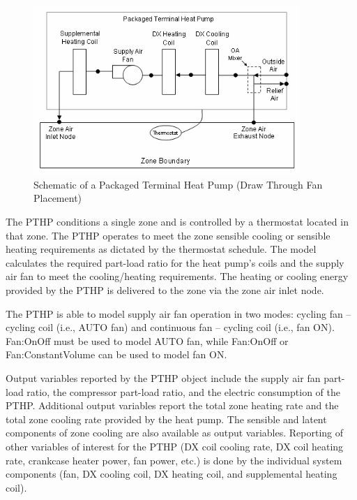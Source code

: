 \begin{figure}[hbtp] %
\centering
\includegraphics[width=0.9\textwidth, height=0.9\textheight, keepaspectratio=true]{media/image7215.png}
\caption{Schematic of a Packaged Terminal Heat Pump (Draw Through Fan Placement) \protect \label{fig:schematic-of-a-packaged-terminal-heat-pump}}
\end{figure}

The PTHP conditions a single zone and is controlled by a thermostat located in that zone. The PTHP operates to meet the zone sensible cooling or sensible heating requirements as dictated by the thermostat schedule. The model calculates the required part-load ratio for the heat pump's coils and the supply air fan to meet the cooling/heating requirements. The heating or cooling energy provided by the PTHP is delivered to the zone via the zone air inlet node.

The PTHP is able to model supply air fan operation in two modes: cycling fan -- cycling coil (i.e., AUTO fan) and continuous fan -- cycling coil (i.e., fan ON). Fan:OnOff must be used to model AUTO fan, while Fan:OnOff or Fan:ConstantVolume can be used to model fan ON.

Output variables reported by the PTHP object include the supply air fan part-load ratio, the compressor part-load ratio, and the electric consumption of the PTHP. Additional output variables report the total zone heating rate and the total zone cooling rate provided by the heat pump. The sensible and latent components of zone cooling are also available as output variables. Reporting of other variables of interest for the PTHP (DX coil cooling rate, DX coil heating rate, crankcase heater power, fan power, etc.) is done by the individual system components (fan, DX cooling coil, DX heating coil, and supplemental heating coil).


